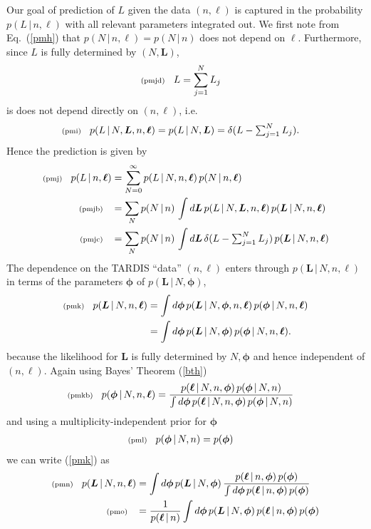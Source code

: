 \documentclass[11pt]{article}
\newcommand{\fred}[1]{\todo[inline]{#1}} %
\newcommand{\checked}[1]{\todo[color=green,noline]{\checkmark}} %
\newcommand{\lleq}[1]{\label{#1} }
\renewcommand{\lleq}[1]{\label{#1} {\scriptstyle {\rm (#1)}} \hspace*{2ex} }
\newcommand{\cond}{\,|\,}
\newcommand{\bml}{{\bm{\ell}}}
\newcommand{\bmL}{{\bm{L}}}
\newcommand{\bmphi}{{\bm{\phi}}}
\begin{document}
Our goal of prediction of $L$ given the data $(n,\bml)$ is captured in
the probability $p(L\cond n,\bml)$ with all relevant parameters
integrated out. We first note from Eq.~(\ref{pmh}) that $p(N\cond
n,\bml) = p(N\cond n)$ does not depend on $\bml$. Furthermore, since
$L$ is fully determined by $(N,\bmL)$,
\begin{align}
  \lleq{pmjd}
  L &= \sum_{j=1}^N L_j
\end{align}
is does not depend directly on $(n,\bml)$, i.e.\
\begin{align}
  \lleq{pmi}
  p(L\cond N,\bmL,n,\bml)
  = p(L\cond N,\bmL)
  &= \delta(L - \textstyle\sum_{j=1}^N L_j).
\end{align}
\checked{}
Hence the prediction is given by
\begin{align}
  \lleq{pmj}
  p(L\cond n,\bml)
  &= \sum_{N=0}^\infty p(L\cond N,n,\bml)\,p(N\cond n,\bml) \\
  \lleq{pmjb}
  &= \sum_N p(N\cond n)\,\int d\bmL\, p(L\cond N,\bmL,n,\bml)\, p(\bmL\cond N,n,\bml)
  \\
  \lleq{pmjc}
  &= \sum_N p(N\cond n)\,\int d\bmL\,\delta(L - \textstyle\sum_{j=1}^N L_j)
  \, p(\bmL\cond N,n,\bml)
\end{align}
\checked{}
The dependence on the TARDIS ``data'' $(n,\bml)$ enters through
$p(\bmL\cond N,n,\bml)$ in terms of the parameters $\bmphi$ of
$p(\bmL\cond N,\bmphi)$,
\begin{align}
  \lleq{pmk}
  p(\bmL\cond N,n,\bml)
  &= \int d\bmphi\, p(\bmL\cond N,\bmphi,n,\bml)\,p(\bmphi\cond N,n,\bml) \\
  &= \int d\bmphi\, p(\bmL\cond N,\bmphi)\,p(\bmphi\cond N,n,\bml).
\end{align}
because the likelihood for $\bmL$ is fully determined by $N,\bmphi$
and hence independent of $(n,\bml)$.
%
Again using Bayes' Theorem (\ref{bth})
\begin{align}
  \lleq{pmkb}
  p(\bmphi\cond N,n,\bml) &=
  \frac{p(\bml\cond N,n,\bmphi)\,p(\bmphi\cond N,n)} %
  {\int d\bmphi\,p(\bml\cond N,n,\bmphi)\,p(\bmphi\cond N,n)} %
\end{align}
\fred{$p(\bmphi\cond N,n,\bml) = p(\bmphi\cond n,\bml)$ }
and using a multiplicity-independent prior for $\bmphi$
\begin{align}
  \lleq{pml}
  p(\bmphi\cond N,n) &= p(\bmphi)
\end{align}
we can write (\ref{pmk}) as
\begin{align}
  \lleq{pmn}
  p(\bmL\cond N,n,\bml)
  &= \int d\bmphi\, p(\bmL\cond N,\bmphi)\, %
  \frac{p(\bml\cond n,\bmphi)\,p(\bmphi)} %
  {\int d\bmphi\,p(\bml\cond n,\bmphi)\,p(\bmphi)} \\
  \lleq{pmo}
  &= \frac{1}  {p(\bml\cond n)} %
  \int d\bmphi\, p(\bmL\cond N,\bmphi)\, %
  p(\bml\cond n,\bmphi)\,p(\bmphi)
\end{align}
\end{document}
